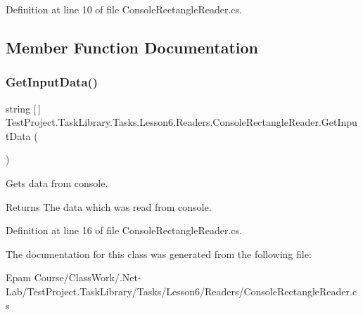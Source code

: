 Definition at line 10 of file Console\+Rectangle\+Reader.\+cs.



\subsection{Member Function Documentation}
\mbox{\label{class_test_project_1_1_task_library_1_1_tasks_1_1_lesson6_1_1_readers_1_1_console_rectangle_reader_a1d25f81281ba9861388154f7369c4e8e}} 
\subsubsection{\texorpdfstring{GetInputData()}{GetInputData()}}
{\footnotesize\ttfamily string \mbox{[}$\,$\mbox{]} Test\+Project.\+Task\+Library.\+Tasks.\+Lesson6.\+Readers.\+Console\+Rectangle\+Reader.\+Get\+Input\+Data (\begin{DoxyParamCaption}{ }\end{DoxyParamCaption})}



Gets data from console. 

\begin{DoxyReturn}{Returns}
The data which was read from console.
\end{DoxyReturn}


Definition at line 16 of file Console\+Rectangle\+Reader.\+cs.



The documentation for this class was generated from the following file\+:\begin{DoxyCompactItemize}
\item 
Epam Course/\+Class\+Work/.\+Net-\/\+Lab/\+Test\+Project.\+Task\+Library/\+Tasks/\+Lesson6/\+Readers/Console\+Rectangle\+Reader.\+cs\end{DoxyCompactItemize}
